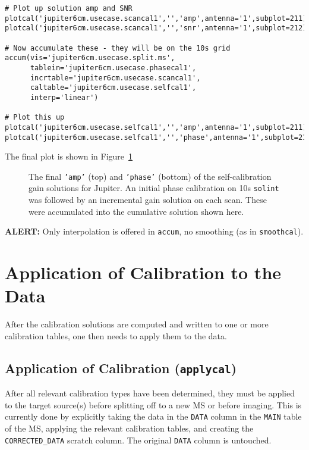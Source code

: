 {\begin{verbatim}
# Plot up solution amp and SNR
plotcal('jupiter6cm.usecase.scancal1','','amp',antenna='1',subplot=211)
plotcal('jupiter6cm.usecase.scancal1','','snr',antenna='1',subplot=212)

# Now accumulate these - they will be on the 10s grid
accum(vis='jupiter6cm.usecase.split.ms',
      tablein='jupiter6cm.usecase.phasecal1',
      incrtable='jupiter6cm.usecase.scancal1',
      caltable='jupiter6cm.usecase.selfcal1',
      interp='linear')

# Plot this up
plotcal('jupiter6cm.usecase.selfcal1','','amp',antenna='1',subplot=211)
plotcal('jupiter6cm.usecase.selfcal1','','phase',antenna='1',subplot=212)
\end{verbatim}
\normalsize
The final plot is shown in Figure~\ref{fig:accum_jupiter}

\begin{figure}[h!]
\begin{center}
\caption{\label{fig:accum_jupiter} The final {\tt 'amp'} (top) and
{\tt 'phase'} (bottom) of the self-calibration gain solutions
for Jupiter.  An initial phase calibration on 10s {\tt solint} was
followed by an incremental gain solution on each scan.  These
were accumulated into the cumulative solution shown here.
}
\hrulefill
\end{center}
\end{figure}

{\bf ALERT:} Only interpolation is offered in {\tt accum},
no smoothing (as in {\tt smoothcal}).

\section{Application of Calibration to the Data}
\label{section:cal.correct}

After the calibration solutions are computed and written to
one or more calibration tables, one then needs to apply them to the data.

\subsection{Application of Calibration ({\tt applycal})}
\label{section:cal.correct.apply}

After all relevant calibration types have been determined, they must
be applied to the target source(s) before splitting off to a new
MS or before imaging.  This is currently done by explicitly taking the
data in the {\tt DATA} column in the {\tt MAIN} table of the MS, 
applying the relevant calibration tables, and creating the 
{\tt CORRECTED\_DATA} scratch column.  The original {\tt DATA}
column is untouched.

}
